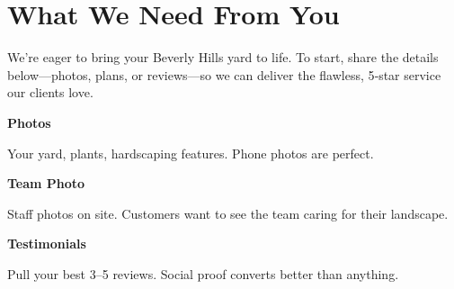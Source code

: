 \documentclass[11pt,letterpaper]{article}
\begin{document}
\vspace{0.2em}

\section*{What We Need From You}

We're eager to bring your Beverly Hills yard to life. To start, share the details below—photos, plans, or reviews—so we can deliver the flawless, 5‑star service our clients love.

\vspace{0.12em}

\noindent\begin{minipage}[t]{0.48\textwidth}
\begin{tcolorbox}[colframe=accent-teal, boxrule=1pt, left=0.7em, right=0.7em, top=0.5em, bottom=0.5em, arc=4pt, boxsep=0pt]
{\bfseries\small\color{accent-teal}Photos}

\vspace{0.15em}

{\small Your yard, plants, hardscaping features. Phone photos are perfect.}
\end{tcolorbox}

\vspace{0.1em}

\begin{tcolorbox}[colframe=accent-teal, boxrule=1pt, left=0.7em, right=0.7em, top=0.5em, bottom=0.5em, arc=4pt, boxsep=0pt]
{\bfseries\small\color{accent-teal}Team Photo}

\vspace{0.15em}

{\small Staff photos on site. Customers want to see the team caring for their landscape.}
\end{tcolorbox}

\vspace{0.1em}

\begin{tcolorbox}[colframe=accent-teal, boxrule=1pt, left=0.7em, right=0.7em, top=0.5em, bottom=0.5em, arc=4pt, boxsep=0pt]
{\bfseries\small\color{accent-teal}Testimonials}

\vspace{0.15em}

{\small Pull your best 3--5 reviews. Social proof converts better than anything.}
\end{tcolorbox}
\end{minipage}
\hfill
\end{document}
